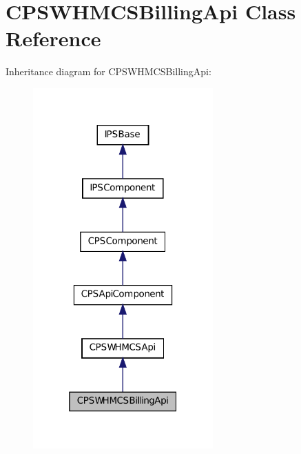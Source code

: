 \hypertarget{classCPSWHMCSBillingApi}{
\section{CPSWHMCSBillingApi Class Reference}
\label{classCPSWHMCSBillingApi}
}


Inheritance diagram for CPSWHMCSBillingApi:\nopagebreak
\begin{figure}[H]
\begin{center}
\leavevmode
\includegraphics[width=196pt]{classCPSWHMCSBillingApi__inherit__graph}
\end{center}
\end{figure}


